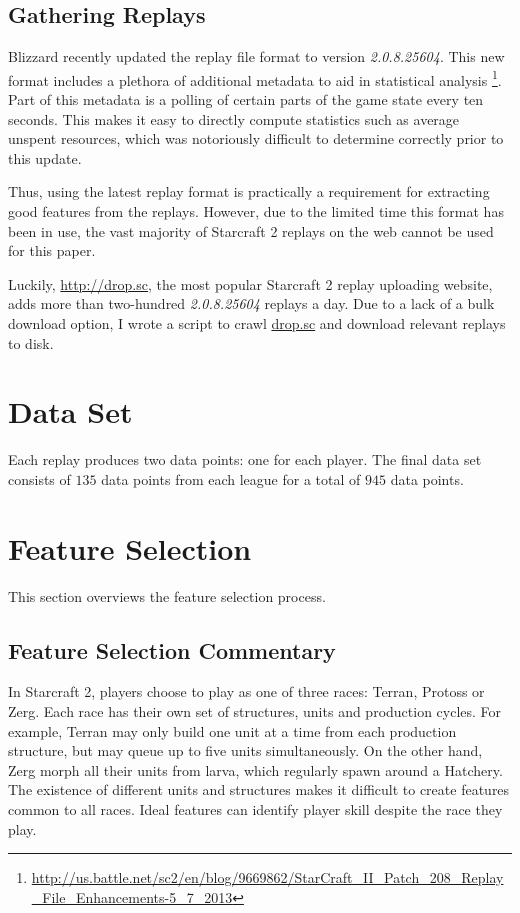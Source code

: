 \documentclass{article} %
\begin{document}
\subsection{Gathering Replays}

Blizzard recently updated the replay file format to version \emph{2.0.8.25604}. This new format includes a plethora of additional metadata to aid in statistical analysis \footnote{\url{http://us.battle.net/sc2/en/blog/9669862/StarCraft_II_Patch_208_Replay_File_Enhancements-5_7_2013}}. Part of this metadata is a polling of certain parts of the game state every ten seconds. This makes it easy to directly compute statistics such as average unspent resources, which was notoriously difficult to determine correctly prior to this update. 

Thus, using the latest replay format is practically a requirement for extracting good features from the replays. However, due to the limited time this format has been in use, the vast majority of Starcraft 2 replays on the web cannot be used for this paper. 

 
Luckily, \url{http://drop.sc}, the most popular Starcraft 2 replay uploading website, adds more than two-hundred \emph{2.0.8.25604} replays a day. Due to a lack of a bulk download option, I wrote a script to crawl \url{drop.sc} and download relevant replays to disk.

\section {Data Set}

Each replay produces two data points: one for each player. The final data set consists of \(135\) data points from each league for a total of \(945\) data points.

\section{Feature Selection} 

This section overviews the feature selection process. 

\subsection{Feature Selection Commentary}

In Starcraft 2, players choose to play as one of three races: Terran, Protoss or Zerg. Each race has their own set of structures, units and production cycles. For example, Terran may only build one unit at a time from each production structure, but may queue up to five units simultaneously. On the other hand, Zerg morph all their units from larva, which regularly spawn around a Hatchery. The existence of different units and structures makes it difficult to create features common to all races. Ideal features can identify player skill despite the race they play.
\end{document}
